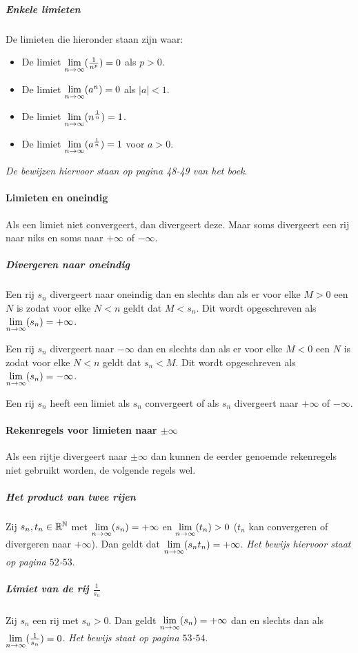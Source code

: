 \subparagraph{Enkele limieten} De limieten die hieronder staan zijn waar:
\begin{itemize}
    \setlength\itemsep{0em}
    \item De limiet $\underset{n\to\infty}{\text{lim}}(\frac{1}{n^{p}})=0$ als $p>0$.
    \item De limiet $\underset{n\to\infty}{\text{lim}}(a^{n})=0$ als $|a|<1$.
    \item De limiet $\underset{n\to\infty}{\text{lim}}(n^{\frac{1}{n}})=1$.
    \item De limiet $\underset{n\to\infty}{\text{lim}}(a^{\frac{1}{n}})=1$ voor $a>0$.
\end{itemize}
\textit{De bewijzen hiervoor staan op pagina 48-49 van het boek}.

\paragraph{Limieten en oneindig} Als een limiet niet convergeert, dan divergeert deze. Maar soms divergeert een rij naar niks en soms naar $+\infty$ of $-\infty$.

\subparagraph{Divergeren naar oneindig} Een rij $s_{n}$ divergeert naar oneindig dan en slechts dan als er voor elke $M>0$ een $N$ is zodat voor elke $N<n$ geldt dat $M<s_{n}$. Dit wordt opgeschreven als $\underset{n\to\infty}{\text{lim}}(s_{n})=+\infty$.\bigskip

\noindent Een rij $s_{n}$ divergeert naar $-\infty$ dan en slechts dan als er voor elke $M<0$ een $N$ is zodat voor elke $N<n$ geldt dat $s_{n}<M$. Dit wordt opgeschreven als $\underset{n\to\infty}{\text{lim}}(s_{n})=-\infty$. \bigskip

\noindent Een rij $s_{n}$ heeft een limiet als $s_{n}$ convergeert of als $s_{n}$ divergeert naar $+\infty$ of $-\infty$.

\paragraph{Rekenregels voor limieten naar $\pm\infty$} Als een rijtje divergeert naar $\pm\infty$ dan kunnen de eerder genoemde rekenregels niet gebruikt worden, de volgende regels wel.

\subparagraph{Het product van twee rijen} Zij $s_{n},t_{n}\in\mathbb{R}^{\mathbb{N}}$ met $\underset{n\to\infty}{\text{lim}}(s_{n})=+\infty$ en $\underset{n\to\infty}{\text{lim}}(t_{n})>0$ ($t_{n}$ kan convergeren of divergeren naar $+\infty$). Dan geldt dat $\underset{n\to\infty}{\text{lim}}(s_{n}t_{n})=+\infty$. \textit{Het bewijs hiervoor staat op pagina $52$-$53$}.

\subparagraph{Limiet van de rij $\frac{1}{s_{n}}$} Zij $s_{n}$ een rij met $s_{n}>0$. Dan geldt $\underset{n\to\infty}{\text{lim}}(s_{n})=+\infty$ dan en slechts dan als $\underset{n\to\infty}{\text{lim}}(\frac{1}{s_{n}})=0$. \textit{Het bewijs staat op pagina $53$-$54$}.

